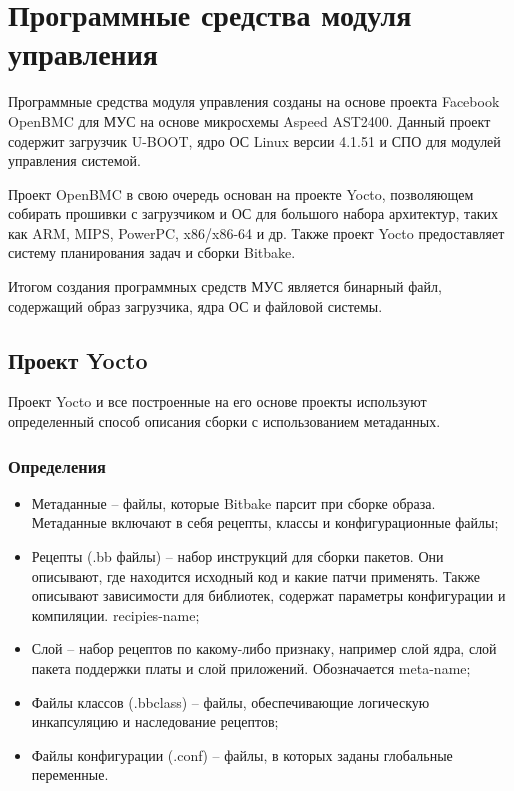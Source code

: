 \section{Программные средства модуля управления}

Программные средства модуля управления созданы на основе проекта Facebook OpenBMC для МУС на основе микросхемы Aspeed AST2400. Данный проект содержит загрузчик U-BOOT, ядро ОС Linux версии 4.1.51 и СПО для модулей управления системой.

Проект OpenBMC в свою очередь основан на проекте Yocto, позволяющем собирать прошивки с загрузчиком и ОС для большого набора архитектур, таких как ARM, MIPS, PowerPC, x86/x86-64 и др. Также проект Yocto предоставляет систему планирования задач и сборки Bitbake.

Итогом создания программных средств МУС является бинарный файл, содержащий образ загрузчика, ядра ОС и файловой системы.

\subsection{Проект Yocto}

Проект Yocto и все построенные на его основе проекты используют определенный способ описания сборки с использованием метаданных.

\subsubsection{Определения}

\begin{itemize}
	\item Метаданные – файлы, которые Bitbake парсит при сборке образа. Метаданные включают в себя рецепты, классы и конфигурационные файлы;
	\item Рецепты (.bb файлы) – набор инструкций для сборки пакетов. Они описывают, где находится исходный код и какие патчи применять. Также описывают зависимости для библиотек, содержат параметры конфигурации и компиляции. recipies-name;
	\item Слой – набор рецептов по какому-либо признаку, например слой ядра, слой пакета поддержки платы и слой приложений. Обозначается meta-name;
	\item Файлы классов (.bbclass) – файлы, обеспечивающие логическую инкапсуляцию и наследование рецептов;
	\item Файлы конфигурации (.conf) – файлы, в которых заданы глобальные переменные.
\end{itemize}

